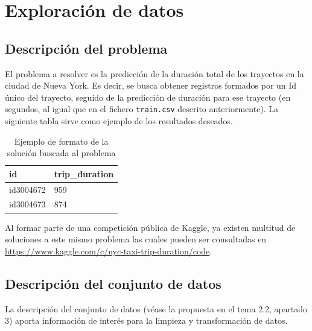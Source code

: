 \documentclass[12pt]{article}
\begin{document}
\newpage
\section{Exploración de datos}
\subsection{Descripción del problema}
El problema a resolver es la predicción de la duración total de los trayectos en la ciudad de Nueva York. Es decir, se busca obtener registros formados por un Id único del trayecto, seguido de la predicción de duración para ese trayecto (en segundos, al igual que en el fichero \texttt{train.csv} descrito anteriormente). La siguiente tabla sirve como ejemplo de los resultados deseados.

\begin{table}[H]
\centering
\begin{tabular}{|p{2.5cm}|p{2.5cm}|}
\hline
id & trip\_duration\\ \hline
id3004672      & 959  \\ \hline
id3004673      & 874  \\ \hline
\end{tabular}
\caption{Ejemplo de formato de la solución buscada al problema}
\end{table}

Al formar parte de una competición pública de Kaggle, ya existen multitud de soluciones a este mismo problema las cuales pueden ser consultadas en \url{https://www.kaggle.com/c/nyc-taxi-trip-duration/code}.\\


\subsection{Descripción del conjunto de datos}

La descripción del conjunto de datos (véase la propuesta en el tema 2.2, apartado 3) aporta información de interés para la limpieza y transformación de datos.
\end{document}
